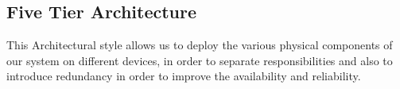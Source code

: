 \subsection{Five Tier Architecture}
\label{subsect:Five Tier Architecture}
This Architectural style allows us to deploy the various physical components of our system on different devices, in order to separate responsibilities and also to introduce redundancy in order to improve the availability and reliability. 
\newpage
